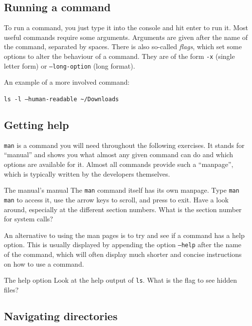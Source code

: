 \documentclass{TheAlternativeCourse}
\begin{document}
\subsection{Running a command}

To run a command, you just type it into the console and hit enter to run it.
Most useful commands require some arguments. Arguments are given after the name
of the command, separated by spaces. There is also so-called \emph{flags},
which set some options to alter the behaviour of a command. They are of the
form \texttt{-x} (single letter form) or \texttt{--long-option} (long format).

An example of a more involved command:

\begin{cmdbox}
\texttt{ls -l --human-readable \textasciitilde/Downloads}
\end{cmdbox}

\subsection{Getting help}

\texttt{man} is a command you will need throughout the following
exercises.  It stands for ``manual'' and shows you what almost any given
command can do and which options are available for it.  Almost all commands
provide such a ``manpage'', which is typically written by the developers
themselves.

\begin{exercisebox}{The manual's manual}
    The \texttt{man} command itself has its own manpage. Type \texttt{man man}
    to access it, use the arrow keys to scroll, and press  to exit.
    Have a look around, especially at the different section numbers.
    What is the section number for system calls?
\end{exercisebox}

An alternative to using the man pages is to try and see if a command has a help
option. This is usually displayed by appending the option \texttt{--help} after
the name of the command, which will often display much shorter and concise
instructions
on how to use a command.

\begin{exercisebox}{The help option}
    Look at the help output of \texttt{ls}. What is the flag to see hidden
    files?
\end{exercisebox}

\subsection{Navigating directories}
\end{document}
